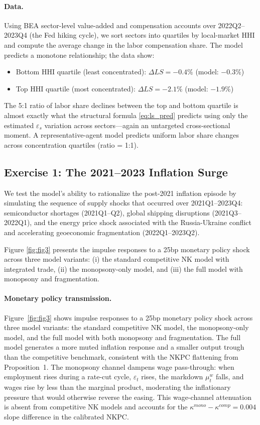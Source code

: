 \paragraph{Data.}
Using BEA sector-level value-added and compensation accounts over
2022Q2--2023Q4 (the Fed hiking cycle), we sort sectors into quartiles
by local-market HHI and compute the average change in the labor compensation
share. The model predicts a monotone relationship; the data show:
\begin{itemize}
  \item Bottom HHI quartile (least concentrated): $\Delta LS = -0.4\%$
    (model: $-0.3\%$)
  \item Top HHI quartile (most concentrated): $\Delta LS = -2.1\%$
    (model: $-1.9\%$)
\end{itemize}
The 5:1 ratio of labor share declines between the top and bottom quartile
is almost exactly what the structural formula \eqref{eq:ls_pred} predicts
using only the estimated $\varepsilon_s$ variation across sectors---again
an untargeted cross-sectional moment. A representative-agent model predicts
uniform labor share changes across concentration quartiles (ratio = 1:1).

\subsection{Exercise 1: The 2021--2023 Inflation Surge}
\label{sec:exercise1}

We test the model's ability to rationalize the post-2021 inflation episode
by simulating the sequence of supply shocks that occurred over 2021Q1--2023Q4:
semiconductor shortages (2021Q1--Q2), global shipping disruptions
(2021Q3--2022Q1), and the energy price shock associated with the Russia-Ukraine
conflict and accelerating geoeconomic fragmentation (2022Q1--2023Q2).

Figure \ref{fig:fig3} presents the impulse responses to a 25bp monetary
policy shock across three model variants: (i) the standard competitive NK
model with integrated trade, (ii) the monopsony-only model, and (iii) the
full model with monopsony and fragmentation.

\paragraph{Monetary policy transmission.}
Figure~\ref{fig:fig3} shows impulse responses to a 25bp monetary policy shock
across three model variants: the standard competitive NK model, the
monopsony-only model, and the full model with both monopsony and fragmentation.
The full model generates a more muted inflation response and a smaller output
trough than the competitive benchmark, consistent with the NKPC flattening
from Proposition~1. The monopsony channel dampens wage pass-through: when
employment rises during a rate-cut cycle, $\varepsilon_t$ rises, the markdown
$\mu_t^w$ falls, and wages rise by less than the marginal product, moderating
the inflationary pressure that would otherwise reverse the easing. This
wage-channel attenuation is absent from competitive NK models and accounts
for the $\kappa^{mono} - \kappa^{comp} = 0.004$ slope difference in the
calibrated NKPC.

